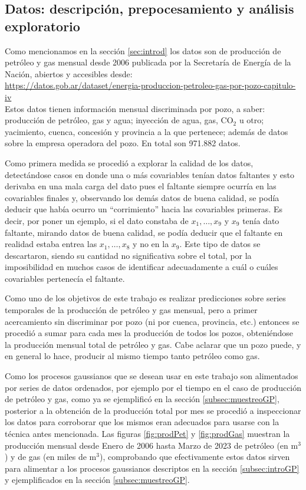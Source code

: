 \documentclass[a4paper]{article}
\begin{document}
\subsection{Datos: descripción, prepocesamiento y análisis exploratorio}
\label{subsec:datosprepoc}
Como mencionamos en la sección \ref{sec:introd} los datos son de producción de petróleo y gas mensual desde 2006 publicada por la Secretaría de Energía de la Nación, abiertos y accesibles desde:\\

\url{https://datos.gob.ar/dataset/energia-produccion-petroleo-gas-por-pozo-capitulo-iv}\\

Estos datos tienen información mensual discriminada por pozo, a saber: producción de petróleo, gas y agua; inyección de agua, gas, CO$_2$ u otro; yacimiento, cuenca, concesión y provincia a la que pertenece; además de datos sobre la empresa operadora del pozo. En total son 971.882 datos.

Como primera medida se procedió a explorar la calidad de los datos, detectándose casos en donde una o más covariables tenían datos faltantes y esto derivaba en una mala carga del dato pues el faltante siempre ocurría en las covariables finales y, observando los demás datos de buena calidad, se podía deducir que había ocurro un ``corrimiento'' hacia las covariables primeras. Es decir, por poner un ejemplo, si el dato constaba de $x_1,\dots,x_9$ y $x_9$ tenía dato faltante, mirando datos de buena calidad, se podía deducir que el faltante en realidad estaba entrea las $x_1,\dots,x_8$ y no en la $x_9$. Este tipo de datos se descartaron, siendo su cantidad no significativa sobre el total, por la imposibilidad en muchos casos de identificar adecuadamente a cuál o cuáles covariables pertenecía el faltante.

Como uno de los objetivos de este trabajo es realizar predicciones sobre series temporales de la producción de petróleo y gas mensual, pero a primer acercamiento sin discriminar por pozo (ni por cuenca, provincia, etc.) entonces se procedió a sumar para cada mes la producción de todos los pozos, obteniéndose la producción mensual total de petróleo y gas. Cabe aclarar que un pozo puede, y en general lo hace, producir al mismo tiempo tanto petróleo como gas.

Como los procesos gaussianos que se desean usar en este trabajo son alimentados por series de datos ordenados, por ejemplo por el tiempo en el caso de producción de petróleo y gas, como ya se ejemplificó en la sección \ref{subsec:muestreoGP}, posterior a la obtención de la producción total por mes se procedió a inspeccionar los datos para corroborar que los mismos eran adecuados para usarse con la técnica antes mencionada. Las figuras \ref{fig:prodPet} y \ref{fig:prodGas} muestran la producción mensual desde Enero de 2006 hasta Marzo de 2023 de petróleo (en m$^3$) y de gas (en miles de m$^3$), comprobando que efectivamente estos datos sirven para alimentar a los procesos gaussianos descriptos en la sección \ref{subsec:introGP} y ejemplificados en la sección \ref{subsec:muestreoGP}.
\end{document}
